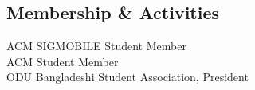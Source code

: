 \documentclass[margin]{res}
\begin{document}
\begin{resume}
 

\section{Membership \& Activities}
ACM SIGMOBILE Student Member\\
ACM Student Member \\
ODU Bangladeshi Student Association, President\\


\end{resume} 
\end{document}
